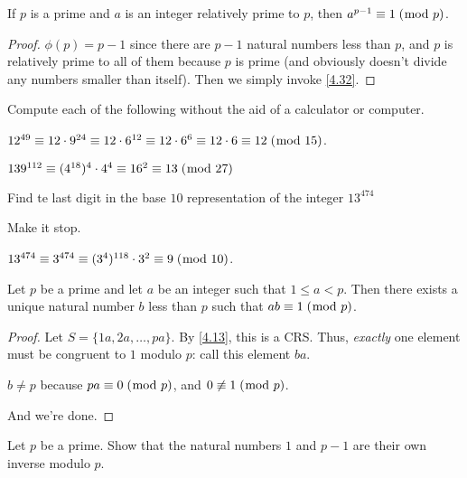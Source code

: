 \documentclass[../main.tex]{subfiles}
\begin{document}
\begin{thm} \label{4.33}
  If $p$ is a prime and $a$ is an integer relatively prime to $p$, then $a^{p-1} \equiv 1 \; (\bmod \; p)$.
\end{thm}

\begin{proof}
  $\phi (p) = p-1$ since there are $p-1$ natural numbers less than $p$, and $p$ is relatively prime to all of them because $p$ is prime (and obviously doesn't divide any numbers smaller than itself). Then we simply invoke \ref{4.32}.
\end{proof}



\begin{ex} \label{4.34}
  Compute each of the following without the aid of a calculator or computer.
\end{ex}

$12^{49} \equiv 12 \cdot 9^{24} \equiv 12 \cdot 6^{12} \equiv 12  \cdot 6^{6} \equiv 12 \cdot 6 \equiv 12 \; (\bmod \; 15)$.

$139^{112} \equiv (4^{18})^4 \cdot 4^4 \equiv 16^2 \equiv 13 \; (\bmod \; 27)$



\begin{ex} \label{4.35}
  Find te last digit in the base $10$ representation of the integer $13^{474}$
\end{ex}

Make it stop.

$13^{474} \equiv 3^{474} \equiv (3^4)^{118} \cdot 3^2 \equiv 9 \; (\bmod \; 10)$.



\begin{thm} \label{4.36}
  Let $p$ be a prime and let $a$ be an integer such that $1 \leq a < p$. Then there exists a unique natural number $b$ less than $p$ such that $ab \equiv 1 \; (\bmod \; p)$.
\end{thm}

\begin{proof}
  Let $S = \{1a, 2a, \ldots, pa\}$. By \ref{4.13}, this is a CRS. Thus, \emph{exactly} one element must be congruent to $1$ modulo $p$: call this element $ba$.

  $b \not = p$ because $pa \equiv 0 \; (\bmod \; p)$, and $0 \not \equiv 1 \; (\bmod \; p)$.

  And we're done.
\end{proof}



\begin{ex} \label{4.37}
  Let $p$ be a prime. Show that the natural numbers $1$ and $p-1$ are their own inverse modulo $p$.
\end{ex}
\end{document}
